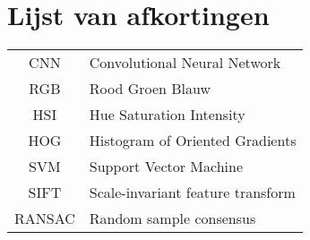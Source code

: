 \chapter*{Lijst van afkortingen}

\begin{table}[!h]
	\begin{tabular}{cl}
        CNN & Convolutional Neural Network \\
        RGB & Rood Groen Blauw \\
        HSI & Hue Saturation Intensity \\
        HOG & Histogram of Oriented Gradients \\
        SVM & Support Vector Machine \\
        SIFT & Scale-invariant feature transform \\
        RANSAC & Random sample consensus \\
	\end{tabular}
\end{table}

